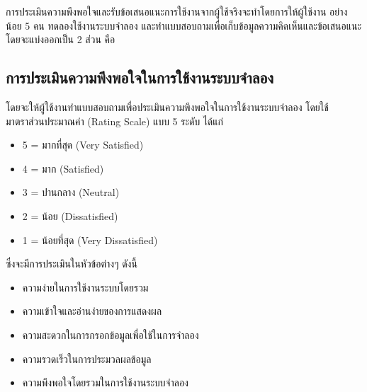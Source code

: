 \begin{mypara}
    \indent การประเมินความพึงพอใจและรับข้อเสนอแนะการใช้งานจากผู้ใช้จริงจะทำโดยการให้ผู้ใช้งาน
    อย่างน้อย 5 คน ทดลองใช้งานระบบจำลอง และทำแบบสอบถามเพื่อเก็บข้อมูลความคิดเห็นและข้อเสนอแนะ
    โดยจะแบ่งออกเป็น 2 ส่วน คือ
    \subsection{การประเมินความพึงพอใจในการใช้งานระบบจำลอง}

        \begin{mypara}
            \indent โดยจะให้ผู้ใช้งานทำแบบสอบถามเพื่อประเมินความพึงพอใจในการใช้งานระบบจำลอง
            โดยใช้มาตราส่วนประมาณค่า (Rating Scale) แบบ 5 ระดับ ได้แก่
            \begin{itemize}
                \item 5 = มากที่สุด (Very Satisfied)
                \item 4 = มาก (Satisfied)
                \item 3 = ปานกลาง (Neutral)
                \item 2 = น้อย (Dissatisfied)
                \item 1 = น้อยที่สุด (Very Dissatisfied)
            \end{itemize}
            ซึ่งจะมีการประเมินในหัวข้อต่างๆ ดังนี้
            \begin{itemize}
                \item ความง่ายในการใช้งานระบบโดยรวม
                \item ความเข้าใจและอ่านง่ายของการแสดงผล
                \item ความสะดวกในการกรอกข้อมูลเพื่อใช้ในการจำลอง
                \item ความรวดเร็วในการประมวลผลข้อมูล
                \item ความพึงพอใจโดยรวมในการใช้งานระบบจำลอง
            \end{itemize}
        \end{mypara}


\end{mypara}
